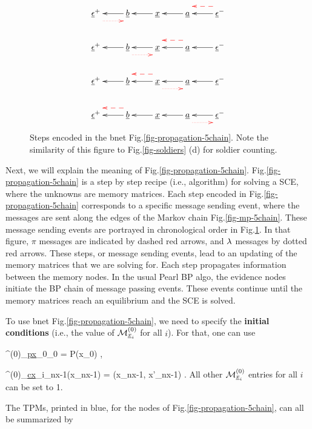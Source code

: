 \begin{figure}[h!]
$$
\xymatrix{
\rveps^+\ar@[red]@{.>}@<-2ex>[r]
&\rvb\ar[l]
&\rvx\ar[l]
&\rva\ar[l]
&\rveps^-\ar[l]\ar@[red]@{-->}@<-2ex>[l]
\\
\rveps^+
&\rvb\ar[l]\ar@[red]@{.>}@<-2ex>[r]
&\rvx\ar[l]
&\rva\ar[l]\ar@[red]@{-->}@<-2ex>[l]
&\rveps^-\ar[l]
\\
\rveps^+
&\rvb\ar[l]
&\rvx\ar[l]\ar@[red]@{.>}@<-2ex>[r]
\ar@[red]@{-->}@<-2ex>[l]
&\rva\ar[l]
&\rveps^-\ar[l]
\\
\rveps^+
&\rvb\ar[l]\ar@[red]@{-->}@<-2ex>[l]
&\rvx\ar[l]
&\rva\ar[l]\ar@[red]@{.>}@<-2ex>[r]
&\rveps^-\ar[l]
}$$
\caption{
Steps encoded in the 
bnet 
Fig.\ref{fig-propagation-5chain}.
Note the 
similarity 
of this figure 
to Fig.\ref{fig-soldiers} (d)
for soldier counting.
} 
\label{fig-multiframe-5chain}
\end{figure}

Next, we will
explain the meaning
of Fig.\ref{fig-propagation-5chain}.
Fig.\ref{fig-propagation-5chain}
is a step by step
recipe (i.e., algorithm)
for solving a SCE,
where the unknowns are
memory matrices.
Each step
encoded in
Fig.\ref{fig-propagation-5chain}
corresponds to a
specific
message sending event,
where the messages
are sent
along the edges 
of the Markov chain
Fig.\ref{fig-mp-5chain}.
These message sending
events are portrayed in
chronological order
in Fig.\ref{fig-multiframe-5chain}.
In that figure,
$\pi$ messages
are indicated by
dashed red arrows,
and $\lambda$ messages
by dotted red arrows.  
These steps, or
message  sending events,
lead to an updating
of the memory matrices
that we are solving for.
Each step propagates information
between the memory nodes.
In the usual Pearl BP algo, 
the evidence nodes 
initiate the BP
chain of 
message passing events.
These events 
continue
until 
the 
memory 
matrices
reach an equilibrium
and the SCE is solved.


To use
bnet 
Fig.\ref{fig-propagation-5chain},
we need to specify
the {\bf initial conditions}
(i.e., the value of 
${\cal M}^{(0)}_{{\underline{x}}_i}$ 
for all $i$).
For that, one can use

\beq
\pi^{(0)}_{\ul{px}_0\ldart \rvx_0}
=
P(x_0)
\;,
\eeq

\beq
\lam^{(0)}_{\ul{cx}_i\rdart\rvx_{nx-1}}(x_{nx-1})
=
\delta(x_{nx-1}, x'_{nx-1})
\;.
\eeq
All other ${\cal M}^{(0)}_{{\underline{x}}_i}$ entries
for all $i$ can be set to 1.

The TPMs, printed in blue, for
the nodes of Fig.\ref{fig-propagation-5chain},
can all be summarized by

